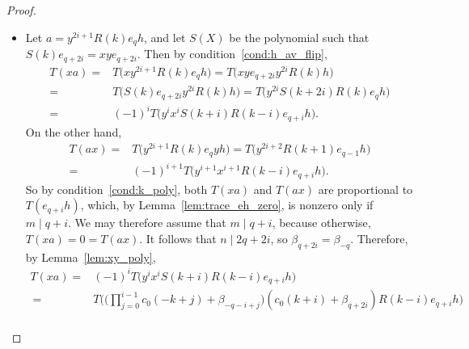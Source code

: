 \documentclass[pdftex]{sigma}
\numberwithin{equation}{section}
\theoremstyle{definition}
\begin{document}
\begin{proof}
\begin{itemize}
\begin{align*}
 e_{q - i} h \bigr) \\
 ={}& T\bigl( x^{i - 1} (xy) y^{i - 1} R(k + i)
 e_{q - i} h \bigr) = T\bigl( x^{i - 1} (xy) y^{i - 1}
 e_{q - i} R(k + i) h \bigr) \\
 ={}& T\bigl( x^{i - 1} (xy) e_{q - 1} y^{i - 1}
 R(k + i) h\bigr) = T\bigl( x^{i - 1} S(k) e_{q - 1} y^{i - 1}
 R(k + i) h \bigr) \\
 ={}& T\bigl( x^{i - 1} y^{i - 1}
 S(k + i - 1) R(k + i) e_{q - i} h\bigr) = T\bigl( x^{2i - 2} S(k)
 R(k + 1) e_{q - 1} h \bigr) \\
 ={}& T\bigl( x^{2i - 2} (xy)
 R(k + 1) e_{q - 1} h \bigr) = T\bigl( x^{2i - 1}
 R(k) e_q y h \bigr) \\
 ={}& T\bigl(x^{2i - 1} R(k) e_q h x\bigr) = T(ax),
 \end{align*}
 as needed.
 \item Let $a = y^{2i + 1} R(k) e_q h$,
 and let $S(X)$ be the polynomial
 such that $S(k) e_{q + 2i} = xy e_{q + 2i}$.
 Then by condition~\ref{cond:h_av_flip},
 \begin{align*}
 T(xa) ={}& T\bigl( x y^{2i + 1}
 R(k) e_q h \bigr) = T\bigl( xy e_{q + 2i} y^{2i}
 R(k) h \bigr) \\
 ={}& T\bigl( S(k) e_{q + 2i} y^{2i}
 R(k) h \bigr) = T\bigl( y^{2i}
 S(k + 2i) R(k) e_q h \bigr) \\
 ={}& (-1)^i T\bigl( y^i x^i
 S(k + i) R(k - i) e_{q + i} h \bigr).
 \end{align*}
 On the other hand,
 \begin{align}
 T(ax) ={}& T\bigl( y^{2i + 1}
 R(k) e_q y h \bigr) = T\bigl( y^{2i + 2}
 R(k + 1) e_{q - 1} h \bigr) \nonumber\\
 ={}& (-1)^{i + 1} T\bigl( y^{i + 1} x^{i + 1}
 R(k - i) e_{q + i} h \bigr).\label{eq:t_ax}
 \end{align}
 So by condition~\ref{cond:k_poly},
 both $T(xa)$ and $T(ax)$
 are proportional to $T(e_{q + i} h)$,
 which, by Lemma~\ref{lem:trace_eh_zero},
 is nonzero only if $m \mid q + i$.
 We may therefore assume that $m \mid q + i$,
 because otherwise, $T(xa) = 0 = T(ax)$.
 It follows that $n \mid 2q + 2i$,
 so $\beta_{q + 2i} = \beta_{-q}$.
 Therefore, by Lemma~\ref{lem:xy_poly},
 \begin{align*}
 T(xa)
 ={}& (-1)^i T\bigl( y^i x^i
 S(k + i) R(k - i) e_{q + i} h \bigr) \\\
 ={}& T\Bigg( \Bigg(
 \prod\limits_{j = 0}^{i - 1}
 c_0 (-k + j) + \beta_{-q - i + j}
 \Bigg)
( c_0 (k + i) + \beta_{q + 2i})
 R(k - i) e_{q + i} h \Bigg) \\

\end{align*}
\end{itemize}
\end{proof}
\end{document}
